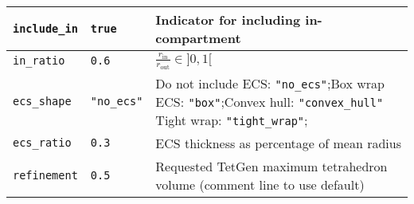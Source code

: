 \begin{tabular}{|l|l|p{8cm}|}
    \verb+include_in+ & \verb+true+ & Indicator for including in-compartment                                                                                                                                                 \\ \hline
    \verb+in_ratio+ & \verb+0.6+ & $\frac{r_\text{in}}{r_\text{out}} \in ]0,1[$                                                                                                                                           \\ \hline
    \verb+ecs_shape+ & \verb+"no_ecs"+ & Do not include ECS: \verb+"no_ecs"+;\newline Box wrap ECS: \verb+"box"+;\newline Convex hull: \verb+"convex_hull"+ \newline Tight wrap: \verb+"tight_wrap"+; \\ \hline
    \verb+ecs_ratio+ & \verb+0.3+ & ECS thickness as percentage of mean radius                                                                                                                                             \\ \hline
    \verb+refinement+ & \verb+0.5+ & Requested TetGen maximum tetrahedron volume (comment line to use default)                                                                                                              \\ \hline
\end{tabular}
